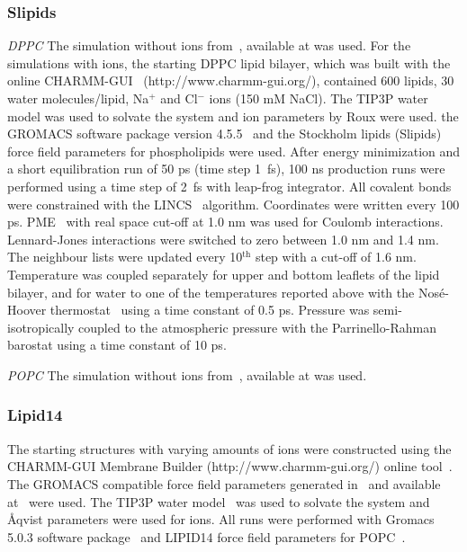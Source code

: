 \documentclass[pre,aps,floatfix,authordate1-4,twocolumn]{revtex4-1}
\begin{document}
\subsubsection{Slipids}
{\it DPPC} The simulation without ions from~\cite{botan15}, available at \cite{slipidsFILES} was used. 
For the simulations with ions, the starting DPPC lipid bilayer, which was built with the online CHARMM-GUI~\cite{lee15}
(http://www.charmm-gui.org/), contained 600 lipids, 30 water molecules/lipid, Na$^+$ and Cl$^-$ ions (150 mM NaCl). 
The TIP3P water model was used to solvate the system and ion parameters by Roux \cite{beglov94,roux96} were used. 
the GROMACS software  package version 4.5.5~\cite{pronk13} and the Stockholm lipids (Slipids) force field parameters 
for phospholipids were used. After energy 
minimization and a short equilibration run of 50 ps (time step 1~fs), 100 ns production runs were performed using 
a time step of 2~fs with leap-frog integrator. All covalent bonds were constrained with the LINCS~\cite{hess97,hess07}
algorithm. Coordinates were written every 100 ps. PME~\cite{darden93,essman95} with real space cut-off at 1.0 nm was used for Coulomb 
interactions. Lennard-Jones interactions were switched to zero between 1.0 nm and 1.4 nm. The neighbour 
lists were updated every 10$^\mathrm{th}$ step with a cut-off of 1.6 nm. Temperature was coupled separately for upper and 
bottom leaflets of the lipid bilayer, and for water to one of the temperatures reported above with the Nos\'e-Hoover 
thermostat~\cite{nose84,hoover85} using a time constant of 0.5 ps. Pressure was semi-isotropically coupled to the atmospheric pressure 
with the Parrinello-Rahman~\cite{parrinello81} barostat using a time constant of 10 ps.

{\it POPC} The simulation without ions from~\cite{botan15}, available at \cite{slipidsFILESpopc} was used. 

\subsubsection{Lipid14}
The starting structures with varying amounts of ions were constructed using the CHARMM-GUI Membrane Builder (http://www.charmm-gui.org/) 
online tool~\cite{lee15}. The GROMACS compatible force field parameters generated in~\cite{botan15} and 
available at~\cite{lipid14files} were used. 
The TIP3P water model~\cite{jorgensen83} was used to solvate the system and \r{A}qvist \cite{aqvist90} parameters were used for ions.
All runs were performed with Gromacs 5.0.3 software package~\cite{abraham15}
and LIPID14 force field parameters for POPC~\cite{dickson14}. 
\end{document}
